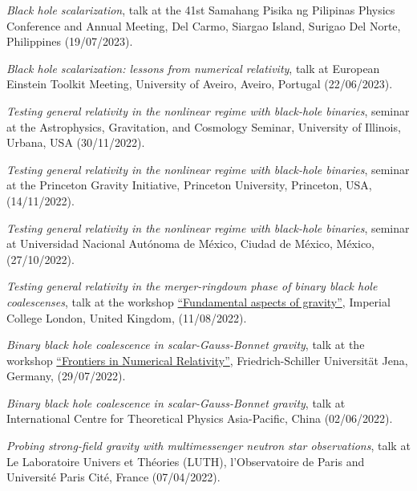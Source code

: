 \documentclass[10pt]{article}
\newcommand{\invited}{{\color{aeilbl}{invited}}}
\begin{document}
\begin{bibenum}
    \item \emph{Black hole scalarization},
    \invited{} talk at the 41st Samahang Pisika ng Pilipinas Physics Conference and Annual Meeting, Del Carmo, Siargao Island, Surigao Del Norte, Philippines
    \hfill (19/07/2023).

    \item \emph{Black hole scalarization: lessons from numerical relativity},
    \invited{} talk at European Einstein Toolkit Meeting, University of Aveiro, Aveiro, Portugal
    \hfill (22/06/2023).

    \item \emph{Testing general relativity in the nonlinear regime with black-hole binaries},
    seminar at the Astrophysics, Gravitation, and Cosmology Seminar, University of Illinois, Urbana, USA
    \hfill (30/11/2022).

    \item
    \emph{Testing general relativity in the nonlinear regime with black-hole binaries},
    \invited{} seminar at the Princeton Gravity Initiative, Princeton University, Princeton, USA,
    (14/11/2022).

    \item
    \emph{Testing general relativity in the nonlinear regime with black-hole binaries},
    \invited{} seminar at Universidad Nacional Aut\'onoma de M\'exico, Ciudad de M\'exico, M\'exico,
    (27/10/2022).

    \item
    \emph{Testing general relativity in the merger-ringdown phase of binary black hole coalescenses},
    \invited{} talk at the workshop \href{https://sites.google.com/view/fundamental-aspects-of-gravity}{``Fundamental aspects of gravity''}, Imperial College London, United Kingdom,
    (11/08/2022).

    \item
    \emph{Binary black hole coalescence in scalar-Gauss-Bonnet gravity},
    talk at the workshop \href{https://sites.google.com/view/fundamental-aspects-of-gravity}{``Frontiers in Numerical Relativity''}, Friedrich-Schiller Universit\"at Jena, Germany, (29/07/2022).

    \item
    \emph{Binary black hole coalescence in scalar-Gauss-Bonnet gravity},
    \invited{} talk at International Centre for Theoretical Physics Asia-Pacific,
    China
    (02/06/2022).

    \item
    \emph{Probing strong-field gravity with multimessenger neutron star observations},
    \invited{} talk at Le Laboratoire Univers et Th\'eories (LUTH), l'Observatoire de Paris and Universit\'e Paris Cit\'e,
    France
    (07/04/2022).


\end{bibenum}
\end{document}
